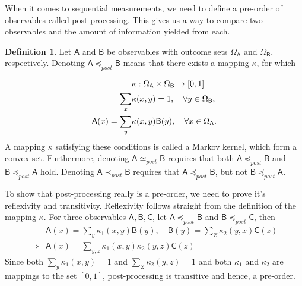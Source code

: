 \documentclass[a4paper,12pt]{wihuri}
\theoremstyle{definition}
\newtheorem{definition}{Definition}
\numberwithin{definition}{section}
\numberwithin{example}{section}
\numberwithin{theorem}{section}
\numberwithin{proposition}{section}
\numberwithin{lemma}{section}
\newcommand{\A}{\mathsf{A}}%
\newcommand{\B}{\mathsf{B}}%
\newcommand{\C}{\mathsf{C}}%
\newcommand{\pp}{\preceq_{post}}
\newcommand{\spp}{\simeq_{post}}
\newcommand{\ppeq}{\prec_{post}}
\begin{document}

When it comes to sequential measurements, we need to define a pre-order of observables called post-processing. This gives us a way to compare two observables and the amount of information yielded from each.
\begin{definition}
Let $\A$ and $\B$ be observables with outcome sets $\Omega_\A$ and $\Omega_\B$, respectively. Denoting $\A \pp \B$ means that there exists a mapping $\kappa$, for which

\begin{align*}
&\kappa : \Omega_\A \times \Omega_\B \rightarrow [0,1]\\
\sum_x &\kappa(x,y) = 1, \quad \forall y \in \Omega_\B, \\
\A(x) = \sum_y &\kappa(x,y)\B(y), \quad \forall x \in \Omega_\A\text.
\end{align*}
A mapping $\kappa$ satisfying these conditions is called a Markov kernel, which form a convex set. Furthermore, denoting $\A \spp \B$ requires that both $\A \pp \B$ and $\B \pp \A$ hold. Denoting $\A \ppeq \B$ requires that $\A \pp \B$, but not $\B \pp \A$.

To show that post-processing really is a pre-order, we need to prove it's reflexivity and transitivity. Reflexivity follows straight from the definition of the mapping $\kappa$. For three observables $\A, \B, \C$, let $\A \pp \B$ and $\B \pp \C$, then
\begin{align*}
&\A(x) = \sum_y \kappa_1(x,y) \B(y), \quad \B(y) = \sum_Z \kappa_2(y,x) \C(z) \\
\Rightarrow & \A(x) = \sum_{y,z} \kappa_1(x,y)\kappa_2(y,z)\C(z)
\end{align*}
Since both $\sum_y \kappa_1(x,y) = 1$ and $\sum_Z \kappa_2(y,z) = 1$ and both $\kappa_1$ and $\kappa_2$ are mappings to the set $[0,1]$, post-processing is transitive and hence, a pre-order.
\end{definition}
\end{document}
